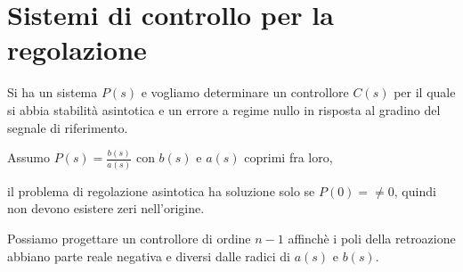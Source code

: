 \chapter{Sistemi di controllo per la regolazione}

Si ha un sistema $P(s)$ e vogliamo determinare un controllore $C(s)$ per il quale si abbia
stabilità asintotica e un errore a regime nullo in risposta al gradino del segnale di riferimento.



Assumo $P(s) = \frac{b(s)}{a(s)}$ con $b(s)$ e $a(s)$ coprimi fra loro,

il problema di regolazione asintotica ha soluzione solo se $P(0) = \neq 0$,
quindi non devono esistere zeri nell'origine.


Possiamo progettare un controllore di ordine $n-1$ affinch\`e i poli 
della retroazione abbiano parte reale negativa e diversi dalle radici di 
$a(s)$ e $b(s)$.




